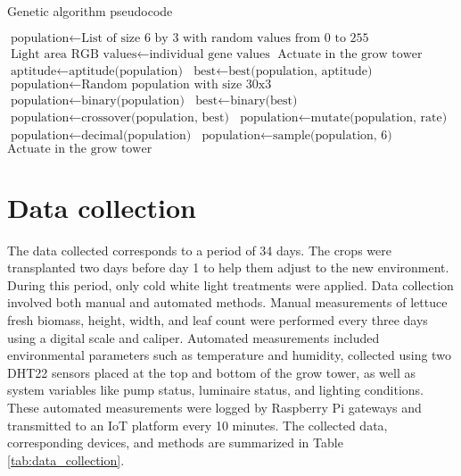 \documentclass[preprint, review, 12pt]{elsarticle}
\begin{document}
\begin{algorithm}
\caption{Genetic algorithm pseudocode}\label{alg:cap}
\begin{algorithmic}
\State $\text{population} \gets \text{List of size 6 by 3 with random values from 0 to 255}$
    \State $\text{Light area RGB values} \gets \text{individual gene values}$
\EndFor
\State $\text{Actuate in the grow tower}$
    \State $\text{aptitude} \gets \text{aptitude(population)}$
    \State $\text{best} \gets \text{best(population, aptitude)}$
    \State $\text{population} \gets \text{Random population with size 30x3}$ 
    \State $\text{population} \gets \text{binary(population)}$
    \State $\text{best} \gets \text{binary(best)}$
    \State $\text{population} \gets \text{crossover(population, best)}$
    \State $\text{population} \gets \text{mutate(population, rate)}$
    \State $\text{population} \gets \text{decimal(population)}$
    \State $\text{population} \gets \text{sample(population, 6)}$ 
    \State $\text{Actuate in the grow tower}$
\EndWhile
\end{algorithmic}
\label{code:geneticAlgorithm}
\end{algorithm}

\section{Data collection}
\label{sec:dataCollection}

The data collected corresponds to a period of 34 days. The crops were transplanted two days before day 1 to help them adjust to the new environment. During this period, only cold white light treatments were applied. Data collection involved both manual and automated methods. Manual measurements of lettuce fresh biomass, height, width, and leaf count were performed every three days using a digital scale and caliper. Automated measurements included environmental parameters such as temperature and humidity, collected using two DHT22 sensors placed at the top and bottom of the grow tower, as well as system variables like pump status, luminaire status, and lighting conditions. These automated measurements were logged by Raspberry Pi gateways and transmitted to an IoT platform every 10 minutes. The collected data, corresponding devices, and methods are summarized in Table \ref{tab:data_collection}.
\end{document}
